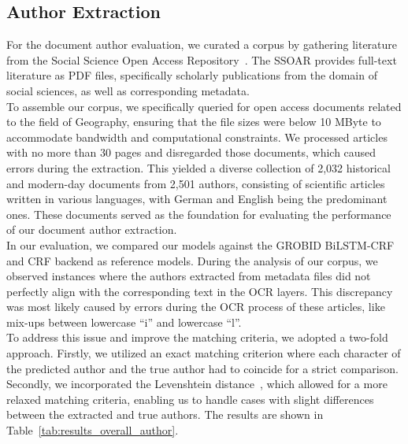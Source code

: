 \subsection{Author Extraction}
For the document author evaluation, we curated a corpus by gathering literature from the Social Science Open Access Repository~\cite{noauthor_ssoar_nodate}. The SSOAR provides full-text literature as PDF files, specifically scholarly publications from the domain of social sciences, as well as corresponding metadata.\\
To assemble our corpus, we specifically queried for open access documents related to the field of Geography, ensuring that the file sizes were below 10 MByte to accommodate bandwidth and computational constraints. We processed articles with no more than 30 pages and disregarded those documents, which caused errors during the extraction. This yielded a diverse collection of 2,032 historical and modern-day documents from 2,501 authors, consisting of scientific articles written in various languages, with German and English being the predominant ones. These documents served as the foundation for evaluating the performance of our document author extraction.\\
In our evaluation, we compared our models against the GROBID BiLSTM-CRF and CRF backend as reference models. During the analysis of our corpus, we observed instances where the authors extracted from metadata files did not perfectly align with the corresponding text in the OCR layers. This discrepancy was most likely caused by errors during the OCR process of these articles, like mix-ups between lowercase \enquote{i} and lowercase \enquote{l}.\\
To address this issue and improve the matching criteria, we adopted a two-fold approach. Firstly, we utilized an exact matching criterion where each character of the predicted author and the true author had to coincide for a strict comparison.\\
Secondly, we incorporated the Levenshtein distance~\cite{levenshtein1966binary}, which allowed for a more relaxed matching criteria, enabling us to handle cases with slight differences between the extracted and true authors. The results are shown in Table~\ref{tab:results_overall_author}.

